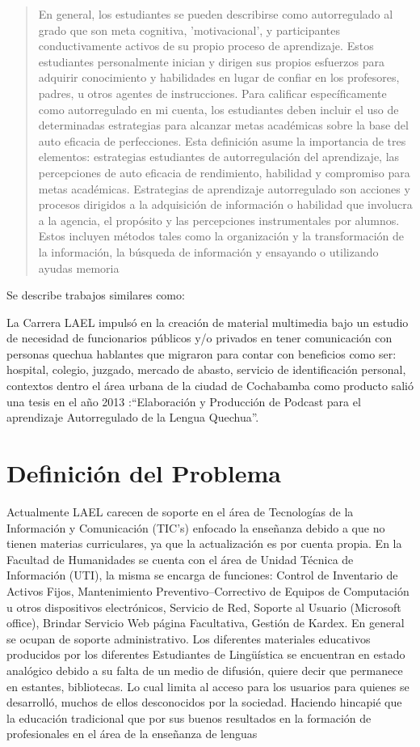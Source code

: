 \blockquote{
En general, los estudiantes se pueden describirse como autorregulado al grado que son meta cognitiva, 
'motivacional', y participantes conductivamente activos de su propio proceso de aprendizaje. Estos estudiantes personalmente inician y dirigen sus propios esfuerzos para adquirir conocimiento y habilidades en lugar de
confiar en los profesores, padres, u otros agentes de instrucciones. Para calificar específicamente como 
autorregulado en mi cuenta, los estudiantes deben incluir el uso de determinadas estrategias para alcanzar
metas académicas sobre la base del auto eficacia de perfecciones. Esta definición asume la importancia de tres
elementos: estrategias estudiantes de autorregulación del aprendizaje, las percepciones de auto eficacia de
rendimiento, habilidad y compromiso para metas académicas. Estrategias de aprendizaje autorregulado son 
acciones y procesos dirigidos a la adquisición de información o habilidad que involucra a la agencia, el
propósito y las percepciones instrumentales por alumnos. Estos incluyen métodos tales como la organización y la
transformación de la información, la búsqueda de información y ensayando o utilizando ayudas memoria \cite{zimmerman1989social}}

\normalsize 

Se describe trabajos similares como: 

La Carrera LAEL impulsó en la creación de material multimedia bajo un estudio de necesidad de funcionarios 
públicos y/o privados en tener comunicación con personas quechua hablantes que migraron para contar con
beneficios como ser: hospital, colegio, juzgado, mercado de abasto, servicio de identificación personal, 
contextos dentro el área urbana de la ciudad de Cochabamba como producto salió una tesis en el año 2013 
:“Elaboración y Producción de Podcast para el aprendizaje Autorregulado de la Lengua Quechua”.\cite{HVLMC2013}

\section{Definición del Problema}

Actualmente LAEL carecen de soporte en el área de Tecnologías de la Información y
Comunicación (TIC's) enfocado la enseñanza debido a que no tienen materias
curriculares, ya que la actualización es por cuenta propia.
En la Facultad de Humanidades se cuenta con el área de Unidad Técnica de
Información (UTI), la misma se encarga de funciones: Control de Inventario de
Activos Fijos, Mantenimiento Preventivo–Correctivo de Equipos de Computación u
otros dispositivos electrónicos, Servicio de Red, Soporte al Usuario (Microsoft
office), Brindar Servicio Web página Facultativa, Gestión de Kardex. En general se
ocupan de soporte administrativo.
Los diferentes materiales educativos producidos por los diferentes Estudiantes de
Lingüística se encuentran en estado analógico debido a su falta de un medio de
difusión, quiere decir que permanece en estantes, bibliotecas. Lo cual limita al acceso
para los usuarios para quienes se desarrolló, muchos de ellos desconocidos por la
sociedad.
Haciendo hincapié que la educación tradicional que por sus buenos resultados en la
formación de profesionales en el área de la enseñanza de lenguas


